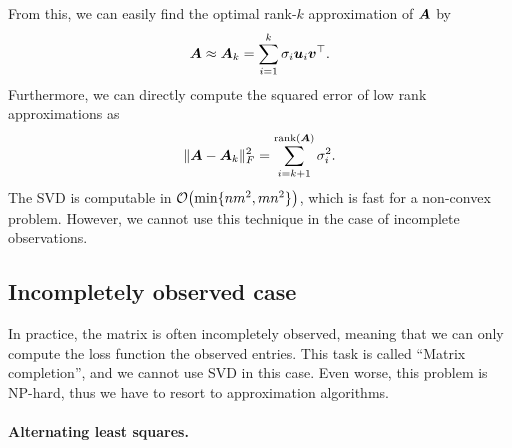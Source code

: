 From this, we can easily find the optimal rank-$k$ approximation of $\bm{A}$ by \[
    \bm{A} \approx \bm{A}_k = \sum_{i=1}^{k} \sigma_i \bm{u}_i \bm{v}^\top.
\]
Furthermore, we can directly compute the squared error of low rank approximations as \[
    \| \bm{A} - \bm{A}_k \|_F^2 = \sum_{i=k+1}^{\mathrm{rank}(\bm{A})} \sigma_i^2.
\]
The SVD is computable in $\bigo{\min \{ nm^2, mn^2 \}}$, which is fast for a non-convex problem.
However, we cannot use this technique in the case of incomplete observations.

\subsection{Incompletely observed case}

In practice, the matrix is often incompletely observed, meaning that we can only compute the loss
function \wrt the observed entries. This task is called ``Matrix completion'', and we cannot use
SVD in this case. Even worse, this problem is NP-hard, thus we have to resort to approximation
algorithms.

\paragraph{Alternating least squares.}

